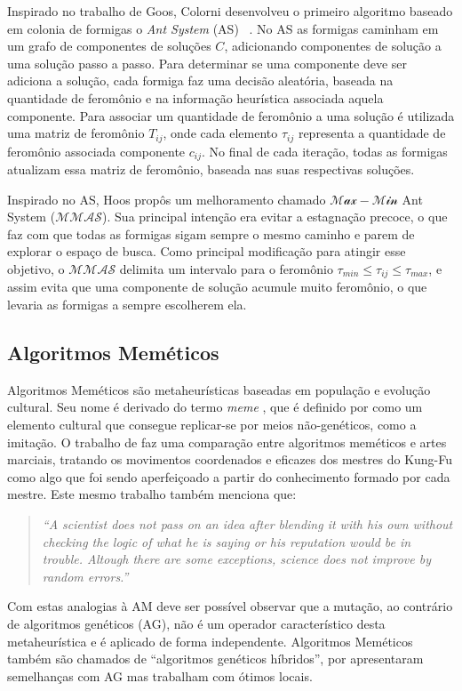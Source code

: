 Inspirado no trabalho de Goos, Colorni desenvolveu o primeiro algoritmo
baseado em colonia de formigas o {\it Ant System} (AS) ~\cite{as-origin}.
No AS as formigas caminham em um grafo de componentes de soluções $C$,
adicionando componentes de solução a uma solução passo a passo. Para
determinar se uma componente deve ser adiciona a solução, cada formiga
faz uma decisão aleatória, baseada na quantidade de feromônio e
na informação heurística associada aquela componente. Para associar um
quantidade de feromônio a uma solução é utilizada uma matriz de feromônio
$T_{ij}$, onde cada elemento $\tau_{ij}$ representa a quantidade de feromônio
associada componente $c_{ij}$. No final de cada iteração, todas as formigas
atualizam essa matriz de feromônio, baseada nas suas respectivas soluções.

Inspirado no AS, Hoos \cite{mmax-origin} propôs um melhoramento chamado
$\mathcal{Max-Min}$ Ant System ($\mathcal{MMAS}$). Sua principal intenção
era evitar a estagnação precoce, o que faz com que todas as formigas sigam
sempre o mesmo caminho e parem de explorar o espaço de busca. Como principal
modificação para atingir esse objetivo, o $\mathcal{MMAS}$ delimita um
intervalo para o feromônio $\tau_{min} \le \tau_{ij} \le \tau_{max}$,
e assim evita que uma componente de solução acumule muito feromônio, %
o que levaria as formigas a sempre escolherem ela.

\subsection{Algoritmos Meméticos}

Algoritmos Meméticos \cite{moscato1} são metaheurísticas baseadas
em população e evolução cultural.
Seu nome é derivado do termo \textit{meme} \cite{dawkins}, que é
definido por \cite{oxford-dict} como um elemento cultural que consegue
replicar-se por meios não-genéticos, como a imitação.
O trabalho de \cite{moscato1} faz uma comparação entre algoritmos
meméticos e artes marciais, tratando os movimentos coordenados e
eficazes dos mestres do Kung-Fu como algo que foi sendo aperfeiçoado
a partir do conhecimento formado por cada mestre. Este mesmo trabalho
também menciona que:
\begin{quote}
\textit{``A scientist does not pass on an idea after blending it with
  his own without checking the logic of what he is saying or his
  reputation would be in trouble. Altough there are some
  exceptions, science does not improve by random errors.''}
\end{quote}
Com estas analogias à AM deve ser possível observar que a mutação, ao
contrário de algoritmos genéticos (AG), não é um operador
característico desta metaheurística e é aplicado de forma
independente. Algoritmos Meméticos também são chamados de ``algoritmos
genéticos híbridos'', por apresentaram semelhanças com AG mas
trabalham com ótimos locais.

